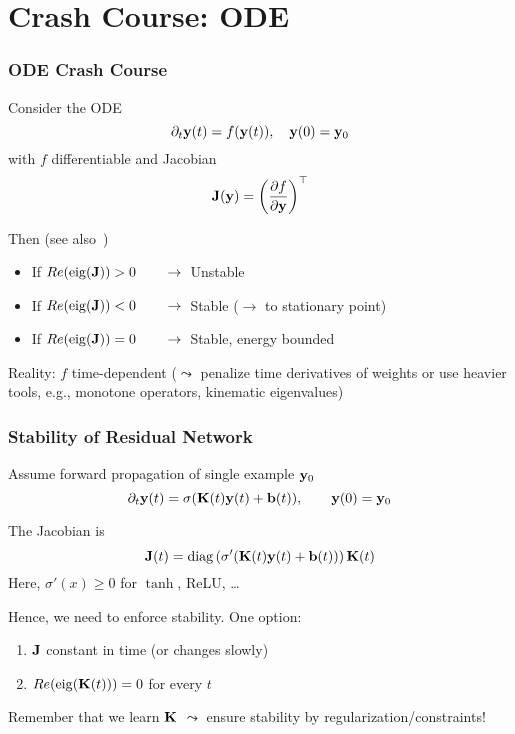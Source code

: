 \documentclass[12pt,fleqn,beamer]{beamer}
\begin{document}
\section{Crash Course: ODE} %
\label{sec:crash_course_ode}
\begin{frame}\frametitle{ODE Crash Course}

Consider the ODE
$$ \partial_t {\bf y}(t) = f({\bf y}(t)), \quad {\bf y}(0) = {\bf y}_0$$
with  $f$ differentiable and Jacobian
$$ {\bf J}({\bf y}) = \left({\frac {\partial f}{\partial {\bf y}}}\right)^\top$$

Then (see also~\cite{AscherPetzold1998,AscherGreif2011,Ascher2010})
\begin{itemize}
\item If $Re({\rm eig}({\bf J})) > 0\quad \quad \rightarrow$\ Unstable
\item If $Re({\rm eig}({\bf J})) < 0\quad \quad \rightarrow$\ Stable ($\rightarrow$ to stationary point)
\item If $Re({\rm eig}({\bf J})) = 0\quad \quad \rightarrow$\ Stable, energy bounded
\end{itemize}

Reality: $f$ time-dependent ($\leadsto$ penalize time derivatives of weights or use heavier tools, e.g., monotone operators, kinematic eigenvalues)

\end{frame}

\begin{frame}
	\frametitle{Stability of Residual Network}
	
	Assume forward propagation of single example ${\bf y}_0$
	$$ \partial_t{{\bf y}}(t) = \sigma({\bf K}(t) {\bf y}(t) + {\bf b}(t)), \quad \quad {\bf y}(0) = {\bf y}_0 $$
	
	\bigskip
	\pause
	
	The Jacobian is
	$$
	 {\bf J}(t) = {\rm diag}\left(\sigma'({\bf K}(t) {\bf y}(t) + {\bf b}(t))\right) {\bf K}(t)
	$$
	Here, $\sigma'(x) \geq 0$ for $\tanh$, ReLU, \ldots
	
	\bigskip
	\pause
	
	Hence, we need to enforce stability. One option:
	\begin{enumerate}
		\item ${\bf J}$ constant in time  (or changes slowly)
		\item $Re({\rm eig}({\bf K}(t)))= 0$ for every $t$
	\end{enumerate}
	
	
	\pause
	
	\begin{center}
		Remember that we  learn ${\bf K}$ $\leadsto$ ensure stability by regularization/constraints!
	\end{center}
	
	
\end{frame}
\end{document}
